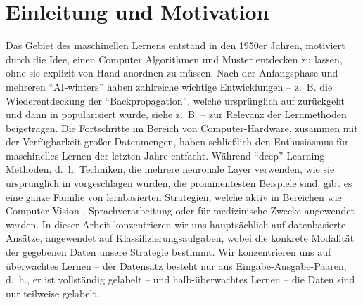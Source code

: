 \section*{Einleitung und Motivation}
%
%
Das Gebiet des maschinellen Lernens entstand in den 1950er Jahren, motiviert durch die Idee, einen Computer Algorithmen und Muster entdecken zu lassen, ohne sie explizit von Hand anordnen zu müssen. Nach der Anfangsphase und mehreren \enquote{AI-winters} \cite{steele1996evolution} haben zahlreiche wichtige Entwicklungen -- z.~B. die Wiederentdeckung der \enquote{Backpropagation}, welche ursprünglich auf \cite{kelley1960gradient,rosenblatt1962principles} zurückgeht und dann in \cite{rumelhart1986learning} popularisiert wurde, siehe z.~B. \cite{schmidhuber2022annotated} -- zur Relevanz der Lernmethoden beigetragen. Die Fortschritte im Bereich von Computer-Hardware, zusammen mit der Verfügbarkeit großer Datenmengen, haben schließlich den Enthusiasmus für maschinelles Lernen der letzten Jahre entfacht. Während \enquote{deep} Learning Methoden, d.~h. Techniken, die mehrere neuronale Layer verwenden, wie sie ursprünglich in \cite{rosenblatt1958perceptron} vorgeschlagen wurden, die prominentesten Beispiele sind, gibt es eine ganze Familie von lernbasierten Strategien, welche aktiv in Bereichen wie Computer Vision \cite{chai2021deep}, Sprachverarbeitung \cite{khurana2023natural} oder für medizinische Zwecke \cite{shehab2022machine} angewendet werden. In dieser Arbeit konzentrieren wir uns hauptsächlich auf datenbasierte Ansätze, angewendet auf Klassifizierungsaufgaben, wobei die konkrete Modalität der gegebenen Daten unsere Strategie bestimmt. Wir konzentrieren uns auf überwachtes Lernen -- der Datensatz besteht nur aus Eingabe-Ausgabe-Paaren, d.~h., er ist vollständig gelabelt -- und halb-überwachtes Lernen -- die Daten sind nur teilweise gelabelt.

